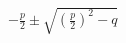 \documentclass[12pt,ngerman]{scrartcl}
\begin{document}
\blindtext

\textit{\blindtext}

\textbf{\textit{\blindtext}}

\( -\frac{p}{2} \pm \sqrt{ \left(\frac{p}{2}\right)^2 -q} \)
\end{document}
